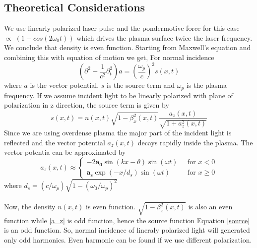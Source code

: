 \documentclass[12pt]{article}
\newenvironment{changemargin}[2]{
\begin{list}{}{
\setlength{\topsep}{0pt}
\setlength{\leftmargin}{#1}
\setlength{\rightmargin}{#2}
\setlength{\listparindent}{\parindent}
\setlength{\itemindent}{\parindent}
\setlength{\parsep}{\parskip}
}
\item[]}{\end{list}}
\begin{document}
\begin{changemargin}{-2cm}{-2cm}
    \subsection{Theoretical Considerations}
    We use linearly polarized laser pulse and the pondermotive force for this case $\propto \; (1-cos(2\omega_0t))$ which drives the plasma surface twice the laser frequency. We conclude that density is even function.
    Starting from Maxwell's  equation and combining this with equation of motion we get, For normal incidence
    \begin{equation}
        \left (\partial^2 - \frac{1}{c^2}\partial_t^2\right )a = \left (\frac{\omega_p}{c}\right )^2s(x,t)
    \end{equation}
    where $a$ is the vector potential, $s$ is the source term and $\omega_p$ is the plasma frequency. If we assume incident light to be linearly polarized with plane of polarization in z direction, the source term is given by
    \begin{equation}\label{source}
        s(x,t) = n(x,t)\sqrt{1-\beta_x^2(x,t)}\frac{a_z(x,t)}{\sqrt{1+a_z^2(x,t)}}
    \end{equation}
    Since we are using overdense plasma the major part of the incident light is reflected and the vector potential $a_z(x,t)$  decays rapidly inside the plasma. The vector potentia can be  approximated by
    \begin{equation}\label{a_z}
        a_z(x,t) \approx \begin{cases}
            -2\mathbf{a_0}\sin(kx-\theta)\sin(\omega t) \; & \text{ for } x < 0   \\
            \mathbf{a_s}\exp(-x/d_s)\sin(\omega t)  \;     & \text{ for } x \ge 0
        \end{cases}
    \end{equation}
    where $d_s = (c/\omega_p)\sqrt{1-(\omega_0 / \omega_p)^2}$\\ \\
    Now, the density $n(x,t)$ is even function. $\sqrt{1-\beta_x^2(x,t)}$ is also an even function while \ref{a_z} is odd function, hence the source function Equation \ref{source} is an odd function. So, normal incidence of lineraly polarized light will generated only odd harmonics. Even harmonic can be found if we use different polarization. \cite{lichters}


\end{changemargin}
\end{document}
